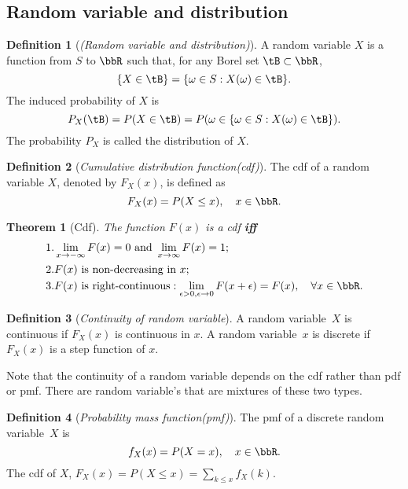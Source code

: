 \documentclass[11pt]{article}
\theoremstyle{plain}
\newtheorem{thm}{Theorem}[section]
\theoremstyle{definition}
\newtheorem{defn}{Definition}
\begin{document}
\subsection{Random variable and distribution}
\begin{defn}[\textit{(Random variable and distribution)}]\label{def:rv}
 A random variable  $X$ is a function from $S$ to $\bbR$ such that, for any Borel set $\tB \subset \bbR$,    \[ \{X \in \tB\} = \{\omega \in S: X(\omega) \in \tB \}. \]
The induced probability of $X$ is \[ P_X(\tB) = P(X \in \tB) = P(\omega \in \{\omega \in S: X(\omega) \in \tB \}).\]
The probability $P_X$ is called the distribution of $X$.
\end{defn}

\begin{defn}[\textit{Cumulative distribution function(cdf)}]\label{def:cdf}
 The cdf of a random variable $X$, denoted by $F_X(x)$, is defined as
\[ F_X(x) = P(X \leq x), \quad x \in \bbR.\]	
\end{defn}

\begin{thm}[Cdf]\label{thm:cdf} The function $F(x)$ is a cdf \textbf{iff}
\begin{align}
	&1. \lim_{x \rightarrow -\infty} F(x) = 0 \text{ and } \lim_{x \rightarrow \infty} F(x) = 1;\\
	&2. F(x) \text{ is non-decreasing in }x;\\
	&3. F(x) \text{ is right-continuous}: \lim_{\epsilon>0, \epsilon \rightarrow 0} F(x + \epsilon) = F(x), \quad \forall x \in \bbR.
\end{align}
	
\end{thm}

\begin{defn}[\textit{Continuity of random variable}]\label{def:contrv}
A random variable\ $X$ is continuous if $F_X(x)$ is continuous in $x$. A random variable\ $x$ is discrete if $F_X(x)$ is a step function of $x$.
\end{defn}

Note that the continuity of a random variable depends on the cdf rather than pdf or pmf. There are random variable's that are mixtures of these two types. 

\begin{defn}[\textit{Probability mass function(pmf)}]\label{def:pmf} The pmf of a discrete random variable\ $X$ is \[ f_X(x) = P(X = x), \quad x \in \bbR.\]
The cdf of $X$, $F_X(x) = P(X \leq x) = \sum_{k \leq x} f_X(k)$.
\end{defn}
\end{document}
